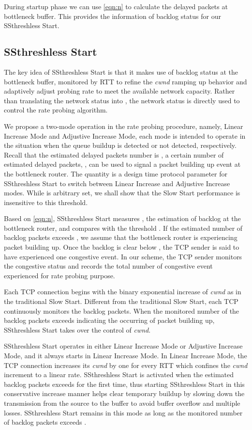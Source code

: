 \documentclass[12pt,onecolumn]{IEEEtran}
\begin{document}
During startup phase we can use \eqref{eqn:n} to calculate the delayed packets
at bottleneck buffer. This provides the information of backlog status for our
SSthreshless Start.

\subsection{SSthreshless Start}

The key idea of SSthreshless Start is that it makes use of backlog status at
the bottleneck buffer, monitored by RTT to refine the \emph{cwnd} ramping up
behavior and adaptively adjust probing rate to meet the available network
capacity. Rather than translating the network status into , the
network status is directly used to control the rate probing algorithm.

We propose a two-mode operation in the rate probing procedure, namely, Linear
Increase Mode and Adjustive Increase Mode, each mode is intended to operate in
the situation when the queue buildup is detected or not detected,
respectively. Recall that the estimated delayed packets number is , a
certain number of estimated delayed packets, , can be used to
signal a packet building up event at the bottleneck router. The quantity
 is a design time protocol parameter for SSthreshless Start to switch
between Linear Increase and Adjustive Increase modes.
While  is arbitrary set, we shall show that the Slow Start performance
is insensitive to this threshold.

Based on \eqref{eqn:n}, SSthreshless Start measures , the estimation of
backlog at the bottleneck router, and compares with the threshold . If
the estimated number of backlog packets exceeds , we assume that the
bottleneck router is experiencing packet building up. Once the backlog is clear
below , the TCP sender is said to have experienced one congestive event.
In our scheme, the TCP sender monitors the congestive status and records the
total number of congestive event experienced for rate probing purpose.

Each TCP connection begins with the binary exponential increase of \emph{cwnd}
as in the traditional Slow Start. Different from the traditional Slow Start,
each TCP continuously monitors the backlog packets. When the monitored number
of the backlog packets exceeds  indicating the occurring of packet
building up, SSthreshless Start takes over the control of \emph{cwnd}.

SSthreshless Start operates in either Linear Increase Mode or Adjustive
Increase Mode, and it always starts in Linear Increase Mode. In Linear Increase
Mode, the TCP connection increases its \emph{cwnd} by one for every RTT which
confines the \emph{cwnd} increment to a linear rate. SSthreshless Start is
activated when the estimated backlog packets exceeds  for the first time, thus
starting SSthreshless Start in this conservative increase manner helps clear
temporary buildup by slowing down the transmission from the source to the
buffer to avoid buffer overflow and multiple losses. SSthreshless Start remains
in this mode as long as the monitored number of backlog packets exceeds
.
\end{document}
